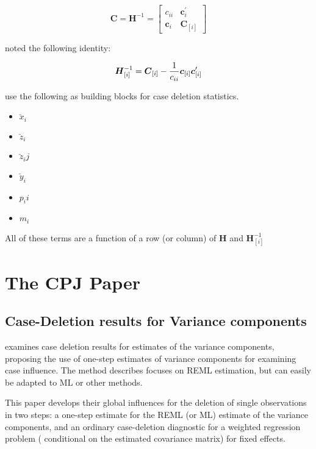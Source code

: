 \documentclass[Main.tex]{subfiles}
\begin{document}
\[ \boldsymbol{C} = \boldsymbol{H}^{-1} = \left[
\begin{array}{cc}
c_{ii} & \boldsymbol{c}_{i}^{\prime}\\
\boldsymbol{c}_{i} &  \boldsymbol{C}_{[i]}
\end{array} \right]
\]

\citet{CPJ} noted the following identity:

\[ \boldsymbol{H}_{[i]}^{-1}  = \boldsymbol{C}_{[i]} - {1 \over c_{ii}}\boldsymbol{c}_{[i]}\boldsymbol{c}_{[i]}^{\prime} \]


\citet{CPJ} use the following as building blocks for case deletion statistics.
\begin{itemize}
	\item $\breve{x}_i$
	\item $\breve{z}_i$
	\item $\breve{z}_ij$
	\item $\breve{y}_i$
	\item $p_ii$
	\item $m_i$
\end{itemize}
All of these terms are a function of a row (or column) of $\boldsymbol{H}$ and $\boldsymbol{H}_{[i]}^{-1}$
\section{The CPJ Paper}%

\subsection{Case-Deletion results for Variance components}
\citet{CPJ} examines case deletion results for estimates of the variance components, proposing the use of one-step estimates of variance components for examining case influence. The method describes focuses on REML estimation, but can easily be adapted to ML or other methods.

This paper develops their global influences for the deletion of single observations in two steps: a one-step estimate for the REML (or ML) estimate of the variance components, and an ordinary case-deletion diagnostic for a weighted regression problem ( conditional on the estimated covariance matrix) for fixed effects.

\end{document}
